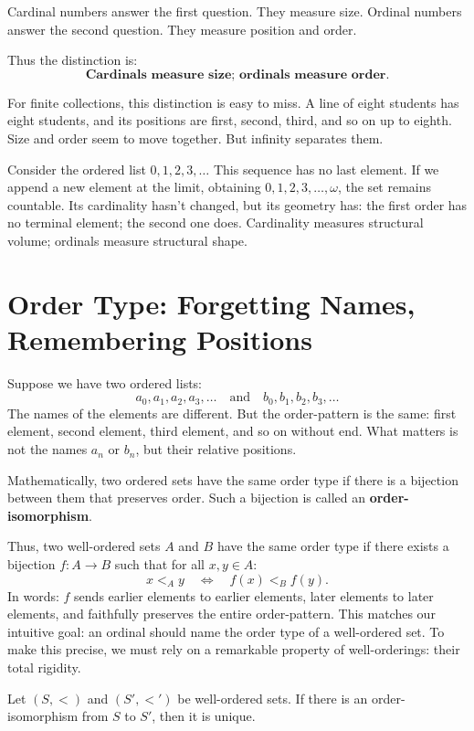 \documentclass[11pt]{article}
\begin{document}
Cardinal numbers answer the first question. They measure size. Ordinal numbers answer the second question. They measure position and order.

Thus the distinction is:
\[
\textbf{Cardinals measure size; ordinals measure order.}
\]

For finite collections, this distinction is easy to miss. A line of eight students has eight students, and its positions are first, second, third, and so on up to eighth. Size and order seem to move together. But infinity separates them.

Consider the ordered list $0, 1, 2, 3, \dots$ This sequence has no last element. If we append a new element at the limit, obtaining $0, 1, 2, 3, \dots, \omega$, the set remains countable. Its cardinality hasn't changed, but its geometry has: the first order has no terminal element; the second one does. Cardinality measures structural volume; ordinals measure structural shape.

\section{Order Type: Forgetting Names, Remembering Positions}

Suppose we have two ordered lists:
\[
a_0,a_1,a_2,a_3,\ldots \quad \text{and} \quad b_0,b_1,b_2,b_3,\ldots
\]
The names of the elements are different. But the order-pattern is the same: first element, second element, third element, and so on without end. What matters is not the names $a_n$ or $b_n$, but their relative positions.

Mathematically, two ordered sets have the same order type if there is a bijection between them that preserves order. Such a bijection is called an \textbf{order-isomorphism}. 

Thus, two well-ordered sets $A$ and $B$ have the same order type if there exists a bijection $f:A\to B$ such that for all $x,y\in A$:
\[
x<_{A}y \quad \Longleftrightarrow \quad f(x)<_{B}f(y).
\]
In words: $f$ sends earlier elements to earlier elements, later elements to later elements, and faithfully preserves the entire order-pattern. This matches our intuitive goal: an ordinal should name the order type of a well-ordered set. To make this precise, we must rely on a remarkable property of well-orderings: their total rigidity.

\begin{proposition}
Let \((S,<)\) and \((S',<')\) be well-ordered sets. If there is an order-isomorphism from $S$ to $S'$, then it is unique.
\end{proposition}
\end{document}
